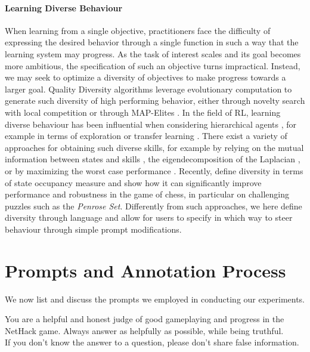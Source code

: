 \documentclass{article} %
\begin{document}
\paragraph{Learning Diverse Behaviour} When learning from a single objective, practitioners face the difficulty of expressing the desired behavior through a single function in such a way that the learning system may progress. As the task of interest scales and its goal becomes more ambitious, the specification of such an objective turns impractical. Instead, we may seek to optimize a diversity of objectives to make progress towards a larger goal. Quality Diversity algorithms \citep{cully2017quality} leverage evolutionary computation to generate such diversity of high performing behavior, either through novelty search with local competition \citep{lehman2011evolving} or through MAP-Elites \citep{cully2015robots,mouret2015illuminating}. In the field of RL, learning diverse behaviour has been influential when considering hierarchical agents \citep{Sutton1999}, for example in terms of exploration \citep{machado2017,dabney2021temporallyextended} or transfer learning \citep{khetarpal2020, DBLP:conf/nips/flexible}. There exist a variety of approaches for obtaining such diverse skills, for example by relying on the mutual information between states and skills \citep{gregor2017variational}, the eigendecomposition of the Laplacian \citep{DBLP:conf/icml/KlissarovM23}, or by maximizing the worst case performance \citep{DBLP:conf/iclr/ZahavySBBFH023}. 
Recently, \citet{DBLP:journals/corr/alphazerodb} define diversity in terms of state occupancy measure and show how it can significantly improve performance and robustness in the game of chess, in particular on challenging puzzles such as the \textit{Penrose Set}. Differently from such approaches, we here define diversity through language and allow for users to specify in which way to steer behaviour through simple prompt modifications. 

\section{Prompts and Annotation Process} \label{appendix:prompts-and-annotations}
We now list and discuss the prompts we employed in conducting our experiments.
\begin{prompt}[h]
\begin{mymessagebox}[frametitle=System prompt]
\small{}\selectfont
You are a helpful and honest judge of good gameplaying and progress in the NetHack game. Always answer as helpfully as possible, while being truthful.\\

If you don't know the answer to a question, please don't share false information.
\end{mymessagebox}
\caption{System prompt, tasking the LLM to be a ``truthful judge".}
\label{prm:system}
\end{prompt}
\end{document}
